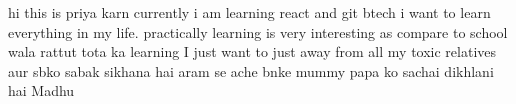 hi this is priya karn
currently i am learning react and git
btech 
i want to learn everything in my life. practically learning is very interesting as compare to school wala rattut tota ka learning
I just want to just away from all my toxic relatives aur sbko sabak sikhana hai aram se ache bnke mummy papa ko sachai dikhlani hai
Madhu 
